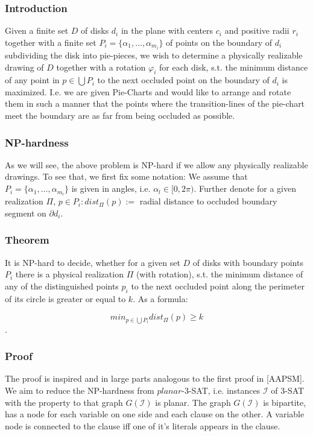\documentclass[a4paper,11pt]{article}
\begin{document}
\subsubsection{Introduction}
Given a finite set $D$ of disks $d_i$ in the plane with centers $c_i$ and positive radii $r_i$ together with a finite set $P_i = \{ \alpha_1, \dots, \alpha_{m_i}\}$ of points on the boundary of $d_i$ subdividing the disk into pie-pieces, we wish to determine a physically realizable drawing of $D$ together with a rotation $\varphi_i$ for each disk, s.t. the minimum distance of any point in $p\in\bigcup P_i$ to the next occluded point on the boundary of $d_i$ is maximized.
I.e. we are given Pie-Charts and would like to arrange and rotate them in such a manner that the points where the transition-lines of the pie-chart meet the boundary are as far from being occluded as possible.

\subsubsection{NP-hardness}
As we will see, the above problem is NP-hard if we allow any physically realizable drawings. To see that, we first fix some notation:
We assume that $P_i = \{ \alpha_1, \dots, \alpha_{m_i}\}$ is given in angles, i.e. $\alpha_l\in [0, 2\pi)$. Further denote for a given realization $\Pi$, $p\in P_i: dist_\Pi(p) := $ radial distance to occluded boundary segment on $\partial d_i$.

\subsubsection{Theorem}
It is NP-hard to decide, whether for a given set $D$ of disks with boundary points $P_i$ there is a physical realization $\Pi$ (with rotation), s.t. the minimum distance of any of the distinguished points $p_i$ to the next occluded point along the perimeter of its circle is greater or equal to $k$. As a formula:

\[min_{p\in\bigcup P_i} dist_\Pi(p) \geq k\].

\subsubsection{Proof}
The proof is inspired and in large parts analogous to the first proof in [AAPSM].
We aim to reduce the NP-hardness from $planar$-3-SAT, i.e. instances $\mathcal{I}$ of 3-SAT with the property to that graph $G(\mathcal{I})$ is planar.
The graph $G(\mathcal{I})$ is bipartite, has a node for each variable on one side and each clause on the other. A variable node is connected to the clause iff one of it's literals appears in the clause.
\end{document}
